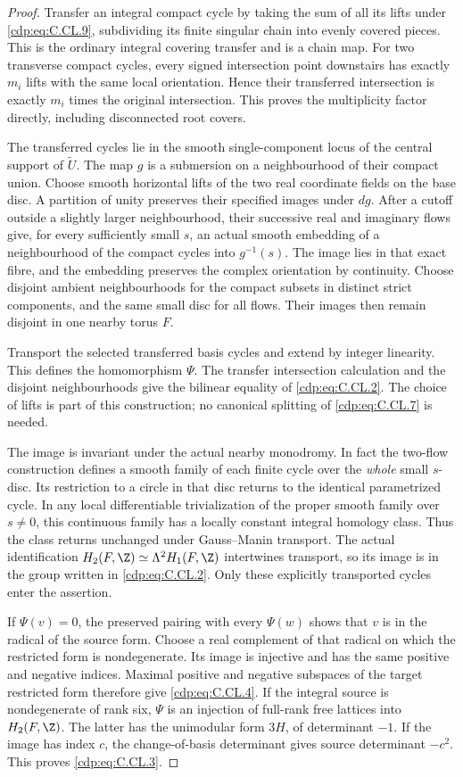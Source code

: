 \begin{proof}
Transfer an integral compact cycle by taking
the sum of all its lifts under \eqref{cdp:eq:C.CL.9},
subdividing its finite singular chain into
evenly covered pieces. This is the ordinary
integral covering transfer and is a chain
map. For two transverse compact cycles,
every signed intersection point downstairs
has exactly $m_i$ lifts with the same local
orientation. Hence their transferred
intersection is exactly $m_i$ times the
original intersection. This proves the
multiplicity factor directly, including
disconnected root covers.

The transferred cycles lie in the smooth
single-component locus of the central
support of $\widetilde U$. The map $g$ is
a submersion on a neighbourhood of their
compact union. Choose smooth horizontal
lifts of the two real coordinate fields
on the base disc. A partition of unity
preserves their specified images under
$dg$. After a cutoff outside a slightly
larger neighbourhood, their successive
real and imaginary flows give, for every
sufficiently small $s$, an actual smooth
embedding of a neighbourhood of the compact
cycles into $g^{-1}(s)$. The image lies in
that exact fibre, and the embedding preserves
the complex orientation by continuity.
Choose disjoint ambient neighbourhoods for
the compact subsets in distinct strict
components, and the same small disc for
all flows. Their images then remain
disjoint in one nearby torus $F$.

Transport the selected transferred basis
cycles and extend by integer linearity.
This defines the homomorphism $\Psi$.
The transfer intersection calculation and
the disjoint neighbourhoods give the
bilinear equality of \eqref{cdp:eq:C.CL.2}. The choice
of lifts is part of this construction;
no canonical splitting of \eqref{cdp:eq:C.CL.7} is
needed.

The image is invariant under the actual
nearby monodromy. In fact the two-flow
construction defines a smooth family of
each finite cycle over the \emph{whole}
small $s$-disc. Its restriction to a
circle in that disc returns to the
identical parametrized cycle. In any
local differentiable trivialization of
the proper smooth family over $s\ne0$,
this continuous family has a locally
constant integral homology class.
Thus the class returns unchanged under
Gauss--Manin transport. The actual
identification
$H_2(F,\Z)\simeq\Lambda^2H_1(F,\Z)$
intertwines transport, so its image is
in the group written in \eqref{cdp:eq:C.CL.2}.
Only these explicitly transported
cycles enter the assertion.

If $\Psi(v)=0$, the preserved pairing
with every $\Psi(w)$ shows that $v$
is in the radical of the source form.
Choose a real complement of that radical
on which the restricted form is
nondegenerate. Its image is injective
and has the same positive and negative
indices. Maximal positive and negative
subspaces of the target restricted form
therefore give \eqref{cdp:eq:C.CL.4}. If the integral
source is nondegenerate of rank six,
$\Psi$ is an injection of full-rank
free lattices into $H_2(F,\Z)$.
The latter has the unimodular form
$3H$, of determinant $-1$. If the
image has index $c$, the change-of-basis
determinant gives source determinant
$-c^2$. This proves \eqref{cdp:eq:C.CL.3}.


\end{proof}
